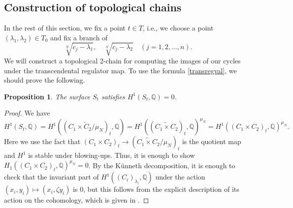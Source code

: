 \documentclass[letterpaper, 11pt]{amsart}
\theoremstyle{my theoremstyle}
\newtheorem{prop}[thm]{Proposition}
\theoremstyle{dfn}
\theoremstyle{remark}
\renewcommand{\1}{\mathbbm{1}}
\newcommand{\Q}{\mathbb{Q}}
\renewcommand{\l}{\lambda}
\numberwithin{equation}{section}
\begin{document}
\subsection{Construction of topological chains}\label{consttop}
In the rest of this section, we fix a point $t\in T$, i.e., we choose a point $(\l_1,\l_2)\in T_0$ and fix a branch of 
\begin{equation}\label{chosenbranch}
\sqrt[N]{c_j-\l_1},\quad\sqrt[N]{c_j-\l_2}\quad (j=1,2,\dots,n). 
\end{equation}
We will construct a topological 2-chain for computing the images of our cycles under the transcendental regulator map.
To use the formula \eqref{transregval}, we should prove the following.
\begin{prop}
The surface $S_t$ satisfies $H^1(S_t,\Q)=0$.
\end{prop}
\begin{proof}
We have 
\begin{equation*}
H^1(S_t,\Q)=H^1((\widetilde{C_1\times C_2/\mu_N})_t,\Q)=H^1((\widetilde{C_1\times C_2})_t,\Q)^{\mu_N} = H^1((C_1\times C_2)_t,\Q)^{\mu_N}.
\end{equation*}
Here we use the fact that $(C_1\times C_2)_t\to (\widetilde{C_1\times C_2}/\mu_N)_t$ is the quotient map and $H^1$ is stable under blowing-ups.
Thus, it is enough to show $H_1((C_1\times C_2)_t,\Q)^{\mu_N}=0$.
By the K\"unneth decomposition, it is enough to check that the invariant part of $H^1((C_i)_{\l_i},\Q)$ under the action $(x_i,y_i)\mapsto (x_i,\zeta y_i)$ is 0, but this follows from the explicit description of its action on the cohomology, which is given in \cite[Theorem 6.2]{Archinard}.
\end{proof}
\end{document}
